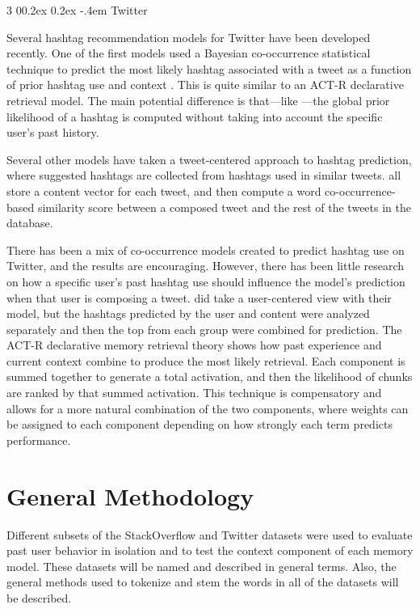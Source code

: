 \documentclass[man,floatsintext,donotrepeattitle]{apa6}
\makeatletter
\renewcommand{\subsubsection}{%
  \@startsection
  {subsubsection}%
  {3}%
  {\parindent}%
  {0\baselineskip \@plus 0.2ex \@minus 0.2ex}%
  {-.4em}%
  {\normalfont\normalsize\bfseries\addperi}}
\makeatother
\begin{document}
\subsubsection{Twitter}

Several hashtag recommendation models for Twitter have been developed recently.
One of the first models used a Bayesian co-occurrence statistical technique to predict the most likely hashtag associated with a tweet as a function of prior hashtag use and context \parencite{Mazzia2009}.
This is quite similar to an ACT-R declarative retrieval model.
The main potential difference is that---like \textcite{Stanley2013}---the global prior likelihood of a hashtag is computed without taking into account the specific user's past history.

Several other models have taken a tweet-centered approach to hashtag prediction, where suggested hashtags are collected from hashtags used in similar tweets.
\textcites{Li2011, Zangerle2011, Kywe2012} all store a content vector for each tweet, and then compute a word co-occurrence-based similarity score between a composed tweet and the rest of the tweets in the database.

There has been a mix of co-occurrence models created to predict hashtag use on Twitter, and the results are encouraging.
However, there has been little research on how a specific user's past hashtag use should influence the model's prediction when that user is composing a tweet.
\textcite{Kywe2012} did take a user-centered view with their model, but the hashtags predicted by the user and content were analyzed separately and then the top from each group were combined for prediction.
The ACT-R declarative memory retrieval theory shows how past experience and current context combine to produce the most likely retrieval.
Each component is summed together to generate a total activation, and then the likelihood of chunks are ranked by that summed activation.
This technique is compensatory and allows for a more natural combination of the two components, where weights can be assigned to each component depending on how strongly each term predicts performance.

\section{General Methodology}

Different subsets of the StackOverflow and Twitter datasets were used to evaluate past user behavior in isolation and to test the context component of each memory model.
These datasets will be named and described in general terms.
Also, the general methods used to tokenize and stem the words in all of the datasets will be described.
\end{document}
